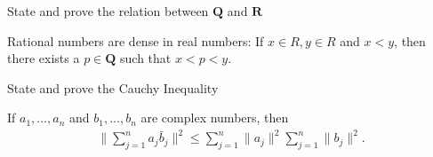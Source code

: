 \documentclass[11pt]{article}
\newcommand{\reals}{\mathbf{R}}
\newcommand{\rationals}{\mathbf{Q}}
\newcommand*{\xfield}[1]{\begin{mdframed}\centering #1\end{mdframed}\bigskip}
\newenvironment{field}{}{}
\newenvironment{note}{}{}
\begin{document}
%
\begin{note}
  \xfield{State and prove the relation between \(\rationals\) and
    \(\reals\)}
  \begin{field}
    Rational numbers are dense in real numbers: If
    \(x \in R, y \in R\) and \(x < y\), then there exists a
    \(p \in \rationals\) such that \(x < p < y\).
  \end{field}
\end{note}
%
\begin{note}
  \xfield{State and prove the Cauchy Inequality}
  \begin{field}
    If \(a_1, \ldots, a_n\) and \(b_1, \ldots, b_n\) are complex
    numbers, then
    \begin{align*}
      \| \sum_{j=1}^n a_j \bar{b}_j \|^2 \leq \sum_{j=1}^n \|a_j\|^2
      \sum_{j=1}^n \|b_j\|^2.
    \end{align*}
  \end{field}
\end{note}
\end{document}
